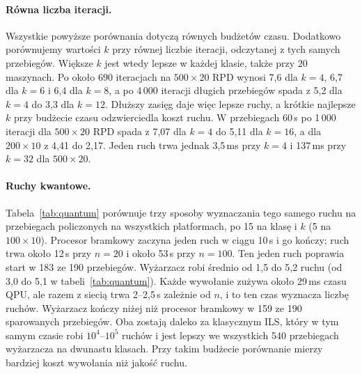 \documentclass[letterpaper]{article} %
\theoremstyle{definition}
\begin{document}
\paragraph{Równa liczba iteracji.} Wszystkie powyższe porównania dotyczą
równych budżetów czasu. Dodatkowo
porównujemy wartości $k$ przy równej liczbie iteracji, odczytanej z tych
samych przebiegów. Większe $k$ jest wtedy lepsze w każdej klasie, także
przy 20 maszynach. Po około 690 iteracjach na $500\times 20$ RPD wynosi
7,6 dla $k=4$, 6,7 dla $k=6$ i 6,4 dla $k=8$, a po 4\,000 iteracji
długich przebiegów spada z 5,2 dla $k=4$ do 3,3 dla $k=12$. Dłuższy
zasięg daje więc lepsze ruchy, a krótkie najlepsze $k$ przy budżecie
czasu odzwierciedla koszt ruchu. W przebiegach 60\,s po 1\,000 iteracji dla
$500\times 20$ RPD spada z 7,07 dla $k=4$ do 5,11 dla $k=16$, a dla
$200\times 10$ z 4,41 do 2,17. Jeden ruch trwa jednak 3,5\,ms przy $k=4$
i 137\,ms przy $k=32$ dla $500\times 20$.


\paragraph{Ruchy kwantowe.} Tabela~\ref{tab:quantum} porównuje trzy
sposoby wyznaczania tego samego ruchu na przebiegach policzonych na
wszystkich platformach, po 15 na klasę i $k$ (5 na $100\times 10$).
Procesor bramkowy zaczyna jeden ruch w ciągu 10\,s i go kończy; ruch trwa około 12\,s
przy $n=20$ i około 53\,s przy $n=100$. Ten jeden ruch poprawia start
w 183 ze 190 przebiegów. Wyżarzacz robi średnio od 1,5 do 5,2 ruchu (od 3,0 do 5,1 w tabeli~\ref{tab:quantum}).
Każde wywołanie zużywa około 29\,ms czasu QPU, ale razem z siecią trwa
2--2,5\,s zależnie od $n$, i to ten czas wyznacza liczbę ruchów. Wyżarzacz kończy niżej
niż procesor bramkowy w 159 ze 190 sparowanych przebiegów. Oba zostają daleko za klasycznym ILS, który
w tym samym czasie robi $10^4$--$10^5$ ruchów i jest lepszy we
wszystkich 540 przebiegach wyżarzacza na dwunastu klasach. Przy takim budżecie porównanie mierzy bardziej koszt
wywołania niż jakość ruchu.
\end{document}
